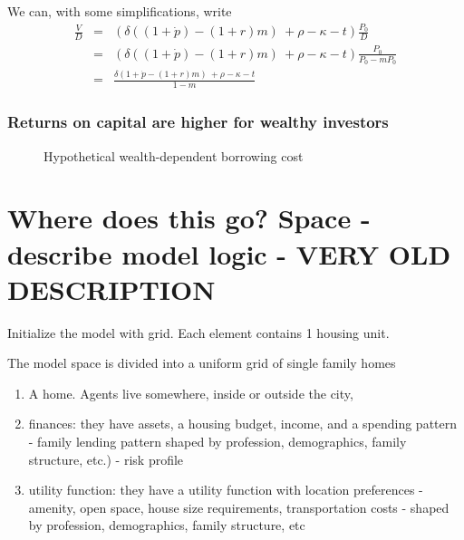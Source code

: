 We can, with some simplifications, write
\begin{eqnarray}
\frac{V}{D}&=&( \delta((1+\dot p)  - (1+r)m) \ + \rho   	-\kappa - t ) \frac{P_0}{D}   \nonumber\\
		&=&( \delta((1+\dot p)  - (1+r)m) \ + \rho   	-\kappa - t ) \frac{P_0}{P_0-mP_0}   \nonumber\\
		&=&\frac{ \delta(1+\dot p  - (1+r)m) \ + \rho   	-\kappa - t } {1-m} \label{Eqn:DecisionRule}
\end{eqnarray}

\subsubsection{Returns on capital are higher for wealthy investors}

\begin{figure}[htb]
\begin{center}

\caption{Hypothetical wealth-dependent borrowing cost}
\label{Fig:BorrowingCost}
\end{center}
\end{figure}%





\section{Where does this go? Space - describe model logic - VERY OLD DESCRIPTION}


Initialize the model with grid. Each element contains 1 housing unit.

The model space is divided into a uniform grid of single family homes %


\begin{enumerate}
   \item A home. Agents live somewhere, inside or outside the city,
   \item finances: they have assets, a housing budget, income, and a spending pattern - family lending pattern  
   shaped by profession, demographics, family structure, etc.) - risk profile
   \item utility function: they have a utility function with location  preferences    - amenity, open space, house size requirements, transportation costs - shaped by profession, demographics, family structure, etc
\end{enumerate}	

